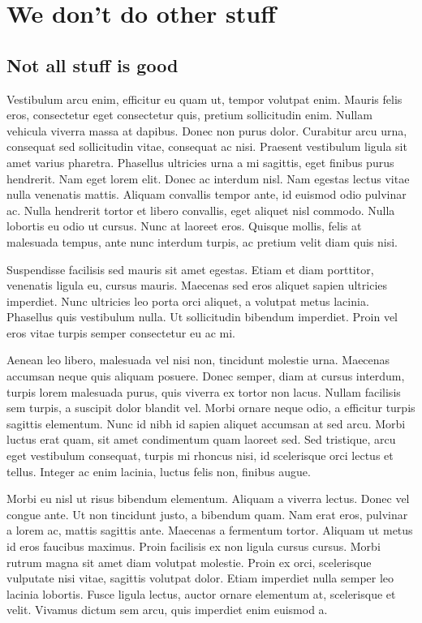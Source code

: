 \chapter{We don't do other stuff}
\section{Not all stuff is good}



Vestibulum arcu enim, efficitur eu quam ut, tempor volutpat enim. Mauris felis eros, consectetur eget consectetur quis, pretium sollicitudin enim. Nullam vehicula viverra massa at dapibus. Donec non purus dolor. Curabitur arcu urna, consequat sed sollicitudin vitae, consequat ac nisi. Praesent vestibulum ligula sit amet varius pharetra. Phasellus ultricies urna a mi sagittis, eget finibus purus hendrerit. Nam eget lorem elit. Donec ac interdum nisl. Nam egestas lectus vitae nulla venenatis mattis. Aliquam convallis tempor ante, id euismod odio pulvinar ac. Nulla hendrerit tortor et libero convallis, eget aliquet nisl commodo. Nulla lobortis eu odio ut cursus. Nunc at laoreet eros. Quisque mollis, felis at malesuada tempus, ante nunc interdum turpis, ac pretium velit diam quis nisi.

Suspendisse facilisis sed mauris sit amet egestas. Etiam et diam porttitor, venenatis ligula eu, cursus mauris. Maecenas sed eros aliquet sapien ultricies imperdiet. Nunc ultricies leo porta orci aliquet, a volutpat metus lacinia. Phasellus quis vestibulum nulla. Ut sollicitudin bibendum imperdiet. Proin vel eros vitae turpis semper consectetur eu ac mi.

Aenean leo libero, malesuada vel nisi non, tincidunt molestie urna. Maecenas accumsan neque quis aliquam posuere. Donec semper, diam at cursus interdum, turpis lorem malesuada purus, quis viverra ex tortor non lacus. Nullam facilisis sem turpis, a suscipit dolor blandit vel. Morbi ornare neque odio, a efficitur turpis sagittis elementum. Nunc id nibh id sapien aliquet accumsan at sed arcu. Morbi luctus erat quam, sit amet condimentum quam laoreet sed. Sed tristique, arcu eget vestibulum consequat, turpis mi rhoncus nisi, id scelerisque orci lectus et tellus. Integer ac enim lacinia, luctus felis non, finibus augue.

Morbi eu nisl ut risus bibendum elementum. Aliquam a viverra lectus. Donec vel congue ante. Ut non tincidunt justo, a bibendum quam. Nam erat eros, pulvinar a lorem ac, mattis sagittis ante. Maecenas a fermentum tortor. Aliquam ut metus id eros faucibus maximus. Proin facilisis ex non ligula cursus cursus. Morbi rutrum magna sit amet diam volutpat molestie. Proin ex orci, scelerisque vulputate nisi vitae, sagittis volutpat dolor. Etiam imperdiet nulla semper leo lacinia lobortis. Fusce ligula lectus, auctor ornare elementum at, scelerisque et velit. Vivamus dictum sem arcu, quis imperdiet enim euismod a.

